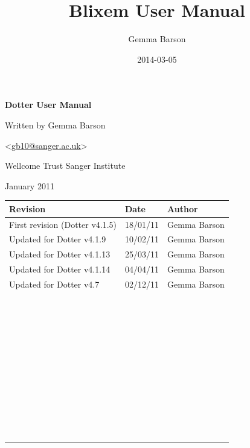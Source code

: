 \documentclass{report}
\title{Blixem User Manual}
\author{Gemma Barson}
\date{2014-03-05}
\begin{document}
\setcounter{page}{1}\pagestyle{Standard}

\thispagestyle{FirstPage}
{\centering\sffamily\bfseries\color[rgb]{0.0,0.27058825,0.5254902}
\Huge\bf{Dotter User Manual}
\par}

\bigskip

{\centering
\large{Written by Gemma Barson}
\par}
{\centering
{\textless}\href{mailto:gb10@sanger.ac.uk}{gb10@sanger.ac.uk}{\textgreater}
\par}

\bigskip

{\centering
\large{Wellcome Trust Sanger Institute}
\par}
{ January 2011
\par}




\begin{center}
\tablehead{}
\begin{supertabular}{|m{8.073cm}|m{3.2849998cm}|m{3.282cm}|}
\hline
\bfseries Revision &
\bfseries Date &
\bfseries Author\\\hline
 First revision (Dotter v4.1.5) &
 18/01/11 &
 Gemma Barson\\\hline
 Updated for Dotter v4.1.9 &
 10/02/11 &
 Gemma Barson\\\hline
 Updated for Dotter v4.1.13 &
 25/03/11 &
 Gemma Barson\\\hline
 Updated for Dotter v4.1.14 &
 04/04/11 &
 Gemma Barson\\\hline
 Updated for Dotter v4.7 &
 02/12/11 &
 Gemma Barson\\\hline
~
 &
~
 &
~
\\\hline
~
 &
~
 &
~
\\\hline
~
 &
~
 &
~
\\\hline
~
 &
~
 &
~
\\\hline
~
 &
~
 &
~
\\\hline
~
 &
~
 &
~
\\\hline
~
 &
~
 &
~
\\\hline
~
 &
~
 &
~
\\\hline
~
 &
~
 &
~
\\\hline
~
 &
~
 &
~
\\\hline
\end{supertabular}
\end{center}
\end{document}
